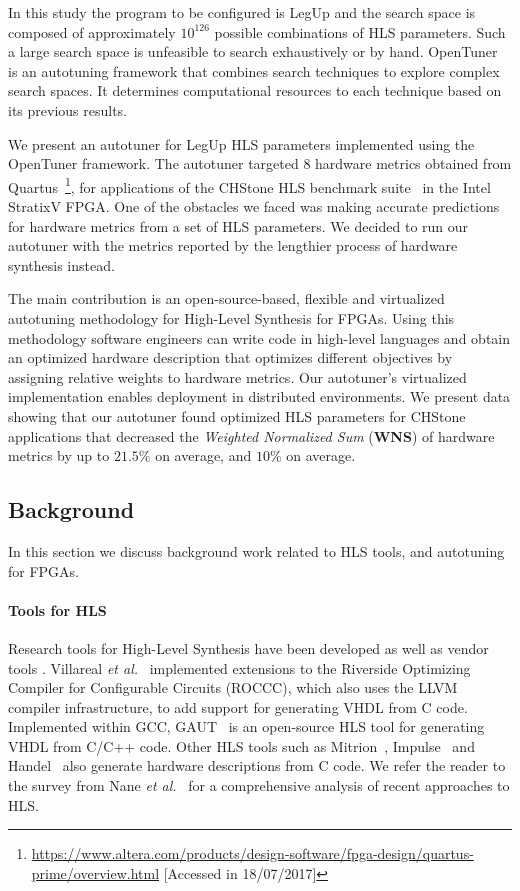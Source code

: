 In this study the program to be configured is LegUp and the search space is
composed of approximately $10^{126}$ possible combinations of HLS parameters.
Such a large search space is unfeasible to search exhaustively or by hand.
OpenTuner~\cite{ansel2014opentuner} is an autotuning framework that combines
search techniques to explore complex search spaces. It determines computational
resources to each technique based on its previous results.

We present an autotuner for LegUp HLS parameters implemented using the
OpenTuner framework.  The autotuner targeted 8 hardware metrics obtained from
Quartus~\footnote{\url{https://www.altera.com/products/design-software/fpga-design/quartus-prime/overview.html}
[Accessed in 18/07/2017]}, for applications of the CHStone HLS benchmark
suite~\cite{hara2008chstone} in the Intel StratixV FPGA.  One of the obstacles
we faced was making accurate predictions for hardware metrics from a set of HLS
parameters. We decided to run our autotuner with the metrics reported by the
lengthier process of hardware synthesis instead.

The main contribution is an open-source-based, flexible and virtualized
autotuning methodology for High-Level Synthesis for FPGAs. Using this
methodology software engineers can write code in high-level languages and
obtain an optimized hardware description that optimizes different objectives by
assigning relative weights to hardware metrics.  Our autotuner's virtualized
implementation enables deployment in distributed environments.  We present data
showing that our autotuner found optimized HLS parameters for CHStone
applications that decreased the \textit{Weighted Normalized Sum} (\textbf{WNS})
of hardware metrics by up to $21.5\%$ on average, and $10\%$ on average.

\subsection{Background}
\label{sec:FPGAbackground}

In this section we discuss background work related to HLS tools,
and autotuning for FPGAs.

\paragraph{Tools for HLS}

Research tools for High-Level Synthesis have been developed as well as vendor
tools \cite{singh2011implementing, feist2012vivado}. Villareal \emph{et
al.}~\cite{villarreal2010designing} implemented extensions to the Riverside
Optimizing Compiler for Configurable Circuits (ROCCC), which also uses the LLVM
compiler infrastructure, to add support for generating VHDL from C code.
Implemented within GCC, GAUT~\cite{coussy2010gaut} is an open-source HLS tool
for generating VHDL from C/C++ code. Other HLS tools such as
Mitrion~\cite{kindratenko2007mitrion}, Impulse~\cite{antola2007novel} and
Handel~\cite{loo2002handel} also generate hardware descriptions from C code.
We refer the reader to the survey from Nane \emph{et al.}~\cite{nane2016survey}
for a comprehensive analysis of recent approaches to HLS.

